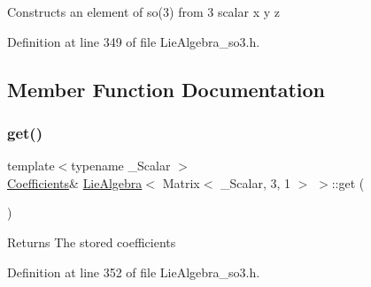 Constructs an element of so(3) from 3 scalar {\ttfamily x} {\ttfamily y} {\ttfamily z} 

Definition at line 349 of file Lie\+Algebra\+\_\+so3.\+h.



\subsection{Member Function Documentation}
\hypertarget{class_lie_algebra_3_01_matrix_3_01___scalar_00_013_00_011_01_4_01_4_a66629af289d8232ba9c2650456654091}{}\label{class_lie_algebra_3_01_matrix_3_01___scalar_00_013_00_011_01_4_01_4_a66629af289d8232ba9c2650456654091} 
\subsubsection{\texorpdfstring{get()}{get()}\hspace{0.1cm}{\footnotesize\ttfamily [1/2]}}
{\footnotesize\ttfamily template$<$typename \+\_\+\+Scalar $>$ \\
\hyperlink{class_lie_algebra_3_01_matrix_3_01___scalar_00_013_00_011_01_4_01_4_a028504a0d794d492dc47b2edd056fe47}{Coefficients}\& \hyperlink{class_lie_algebra}{Lie\+Algebra}$<$ Matrix$<$ \+\_\+\+Scalar, 3, 1 $>$ $>$\+::get (\begin{DoxyParamCaption}{ }\end{DoxyParamCaption})\hspace{0.3cm}{\ttfamily [inline]}}

\begin{DoxyReturn}{Returns}
The stored coefficients 
\end{DoxyReturn}


Definition at line 352 of file Lie\+Algebra\+\_\+so3.\+h.

\hypertarget{class_lie_algebra_3_01_matrix_3_01___scalar_00_013_00_011_01_4_01_4_ad1a20c6cdfc1a3f27ac55685b91611e9}{}\label{class_lie_algebra_3_01_matrix_3_01___scalar_00_013_00_011_01_4_01_4_ad1a20c6cdfc1a3f27ac55685b91611e9} 
